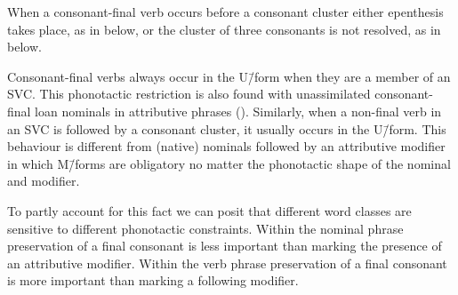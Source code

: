 When a consonant-final verb occurs before a consonant cluster
either epenthesis takes place, as in  below,
or the cluster of three consonants is not resolved,
as in  below.

\begin{exe}
	\label{ex2:130913-1, 2.30}
	\label{ex:120923-1, 6.59}
\end{exe}

Consonant-final verbs always occur in the U\=/form
when they are a member of an SVC.
This phonotactic restriction is also found with
unassimilated consonant-final loan nominals
in attributive phrases ().
Similarly, when a non-final verb in an SVC is followed by a consonant cluster,
it usually occurs in the U\=/form.
This behaviour is different from (native) nominals followed
by an attributive modifier in which M\=/forms are obligatory
no matter the phonotactic shape of the nominal and modifier.

To partly account for this fact we can
posit that different word classes are sensitive to different phonotactic constraints.
Within the nominal phrase preservation of a final consonant
is less important than marking the presence of an attributive modifier.
Within the verb phrase preservation of a final consonant is more
important than marking a following modifier.
